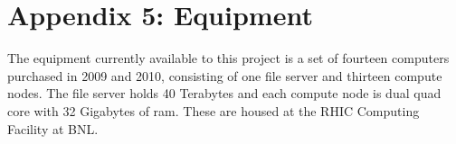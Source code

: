 \documentclass[12pt]{article}
\begin{document}
\newpage
{}
\section*{Appendix 5: Equipment}

The equipment currently available to this project is a set of fourteen
computers purchased in 2009 and 2010, consisting of one file server and
thirteen compute nodes.  The file server holds 40 Terabytes and each compute
node is dual quad core with 32 Gigabytes of ram.  These are housed at the RHIC
Computing Facility at BNL.
\end{document}
